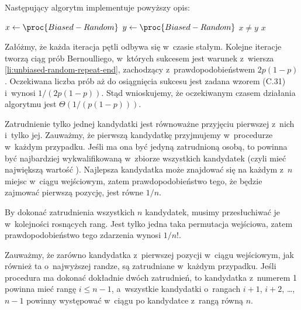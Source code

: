 Następujący algorytm implementuje powyższy opis:
\begin{codebox}
\li	\Repeat
		$x\gets\proc{Biased-Random}$
\li		$y\gets\proc{Biased-Random}$
\li	\Until $x\ne y$ \label{li:unbiased-random-repeat-end}
\li	\Return $x$
\end{codebox}

Załóżmy, że każda iteracja pętli  odbywa się w~czasie stałym.
Kolejne iteracje tworzą ciąg prób Bernoulliego, w~których sukcesem jest warunek z~wiersza \ref{li:unbiased-random-repeat-end}, zachodzący z~prawdopodobieństwem $2p(1-p)$.
Oczekiwana liczba prób aż do osiągnięcia sukcesu jest zadana wzorem (C.31) i~wynosi $1/(2p(1-p))$.
Stąd wnioskujemy, że oczekiwanym czasem działania algorytmu jest $\Theta(1/(p(1-p)))$.


\exercise %
Zatrudnienie tylko jednej kandydatki jest równoważne przyjęciu pierwszej z~nich i~tylko jej.
Zauważmy, że pierwszą kandydatkę przyjmujemy w~procedurze  w~każdym przypadku.
Jeśli ma ona być jedyną zatrudnioną osobą, to powinna być najbardziej wykwalifikowaną w~zbiorze wszystkich kandydatek (czyli mieć największą wartość ).
Najlepsza kandydatka może znajdować się na każdym z~$n$ miejsc w~ciągu wejściowym, zatem prawdopodobieństwo tego, że będzie zajmować pierwszą pozycję, jest równe $1/n$.

By dokonać zatrudnienia wszystkich $n$ kandydatek, musimy przesłuchiwać je w~kolejności rosnących rang.
Jest tylko jedna taka permutacja wejściowa, zatem prawdopodobieństwo tego zdarzenia wynosi $1/n!$.

\exercise %
Zauważmy, że zarówno kandydatka z~pierwszej pozycji w~ciągu wejściowym, jak również ta o~najwyższej randze, są zatrudniane w~każdym przypadku.
Jeśli procedura  ma dokonać dokładnie dwóch zatrudnień, to kandydatka z~numerem 1 powinna mieć rangę $i\le n-1$, a~wszystkie kandydatki o~rangach $i+1$, $i+2$, \dots, $n-1$ powinny występować w~ciągu po kandydatce z~rangą równą $n$.


